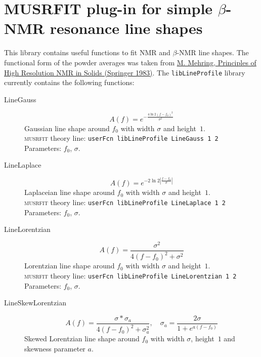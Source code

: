 \documentclass[twoside]{article}
\newcommand{\musrfithead}{MUSRFIT\xspace}
\newcommand{\musrfit}{\textsc{musrfit}\xspace}
\begin{document}
\section*{\musrfithead plug-in for simple $\beta$-NMR resonance line shapes}%
This library contains useful functions to fit NMR and $\beta$-NMR line shapes. 
The functional form of the powder averages was taken from 
\href{http://dx.doi.org/10.1007/978-3-642-68756-3_2}{M. Mehring, Principles 
of High Resolution NMR in Solids (Springer 1983)}.
%
The \texttt{libLineProfile} library currently contains the following functions:
\begin{description}
 \item[LineGauss]
   \begin{equation}
    A(f)=e^{-\frac{4\ln 2 (f-f_0)^2}{ \sigma^2}}
   \end{equation}
   Gaussian line shape around $f_0$ with width $\sigma$ and height~$1$.\\[1.5ex]
   \musrfit theory line: \verb?userFcn libLineProfile LineGauss 1 2?\\[1.5ex]
    Parameters: $f_0$, $\sigma$. 
 \item[LineLaplace]
   \begin{equation}
    A(f)=e^{-2\ln 2 \left|\frac{f-f_0}{\sigma}\right|}
   \end{equation}
   Laplaceian line shape around $f_0$ with width $\sigma$ and 
height~$1$.\\[1.5ex]
   \musrfit theory line: \verb?userFcn libLineProfile LineLaplace 1 2?
\\[1.5ex]
    Parameters: $f_0$, $\sigma$. 
     \item[LineLorentzian]
   \begin{equation}
    A(f)= 
\frac{\sigma^2}{4(f-f_0)^2+\sigma^2}
   \end{equation}
   Lorentzian line shape around $f_0$ with width $\sigma$ and 
height~$1$.\\[1.5ex]
   \musrfit theory line: \verb?userFcn libLineProfile LineLorentzian 1 2?
\\[1.5ex]
    Parameters: $f_0$, $\sigma$.
    \item[LineSkewLorentzian]
   \begin{equation}
    A(f)=  \frac{\sigma*\sigma_a}{4(f-f_0)^2+\sigma_a^2}, \quad \sigma_a=\frac{2\sigma}{1+e^{a(f-f_0)}}
   \end{equation}
   Skewed Lorentzian line shape around $f_0$ with width $\sigma$, 
height~$1$ and skewness parameter $a$.\\[1.5ex]

\end{description}
\end{document}
